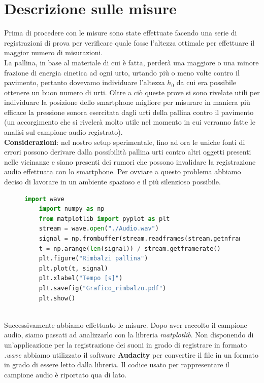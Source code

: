 \documentclass{article}
\begin{document}
\section{Descrizione sulle misure}
Prima di procedere con le misure sono state effettuate facendo una serie di registrazioni di prova per verificare quale fosse l'altezza ottimale per effettuare il maggior numero di misurazioni. \\ La pallina, in base al materiale di cui è fatta, perderà una maggiore o una minore frazione di energia cinetica ad ogni urto, urtando più o meno volte contro il pavimento, pertanto dovevamo individuare l'altezza $h_0$ da cui era possibile ottenere un buon numero di urti. Oltre a ciò queste prove si sono rivelate utili per individuare la posizione dello smartphone migliore per misurare in maniera più efficace la pressione sonora esercitata dagli urti della pallina contro il pavimento (un accorgimento che si rivelerà molto utile nel momento in cui verranno fatte le analisi sul campione audio registrato). \\ \textbf{Considerazioni}: nel nostro setup sperimentale, fino ad ora le uniche fonti di errori possono derivare dalla possibilità pallina urti contro altri oggetti presenti nelle vicinanze e siano presenti dei rumori che possono invalidare la registrazione audio effettuata con lo smartphone. Per ovviare a questo problema abbiamo deciso di lavorare in un ambiente spazioso e il più silenzioso possibile. 

\begin{figure}
	\vspace{-0.5cm}
	\begin{lstlisting}[language=Python]
	import wave
	import numpy as np
	from matplotlib import pyplot as plt
	stream = wave.open("./Audio.wav")
	signal = np.frombuffer(stream.readframes(stream.getnframes()), dtype=np.int16)
	t = np.arange(len(signal)) / stream.getframerate()
	plt.figure("Rimbalzi pallina")
	plt.plot(t, signal)
	plt.xlabel("Tempo [s]")
	plt.savefig("Grafico_rimbalzo.pdf")
	plt.show()
	\end{lstlisting}
\end{figure}

\noindent \\ Successivamente abbiamo effettuato le misure. Dopo aver raccolto il campione audio, siamo passati ad analizzarlo con la libreria \emph{matplotlib}. Non disponendo di un'applicazione per la registrazione dei suoni in grado di registrare in formato \emph{.wave} abbiamo utilizzato il software \textbf{Audacity} per convertire il file in un formato in grado di essere letto dalla libreria. Il codice usato per rappresentare il campione audio è riportato qua di lato. \\ \\
\newpage
\end{document}
